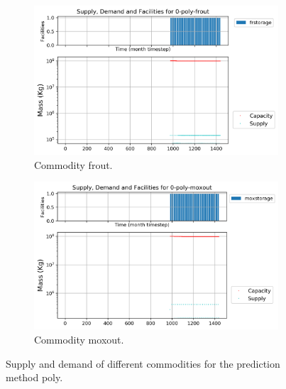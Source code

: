 \documentclass[11pt]{article}
\begin{document}
\begin{figure}[!h]
	\centering
	\begin{subfigure}[]{0.45\textwidth}
		\centering
		\includegraphics[width=\linewidth]{29-figures/0-poly-frout.png} 
		\caption{Commodity frout.}
		\label{fig:29-frout}
	\end{subfigure}
	\vspace{1cm}
	\begin{subfigure}[]{0.45\textwidth}
		\centering
		\includegraphics[width=\linewidth]{29-figures/0-poly-moxout.png} 
		\caption{Commodity moxout.}
		\label{fig:29-moxout}
	\end{subfigure}
	\hfill
	\caption{Supply and demand of different commodities for the prediction method poly.}
	\label{fig:29-out2}
\end{figure}
\end{document}

